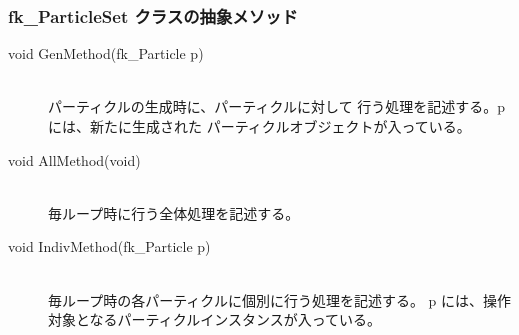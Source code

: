 \subsubsection{fk\_ParticleSet クラスの抽象メソッド}
\begin{description}
\item[void GenMethod(fk\_Particle p)] ~ \\
	パーティクルの生成時に、パーティクルに対して
	行う処理を記述する。p には、新たに生成された
	パーティクルオブジェクトが入っている。\\

\item[void AllMethod(void)] ~ \\
	毎ループ時に行う全体処理を記述する。\\

\item[void IndivMethod(fk\_Particle p)] ~ \\
	毎ループ時の各パーティクルに個別に行う処理を記述する。
	p には、操作対象となるパーティクルインスタンスが入っている。
\end{description}
